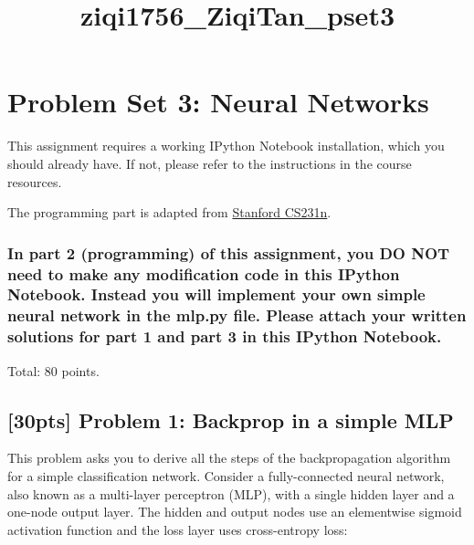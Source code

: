\documentclass[11pt]{article}
\title{ziqi1756\_ZiqiTan\_pset3}
\begin{document}
    
    \maketitle
    
    

    
    \hypertarget{problem-set-3-neural-networks}{%
\section{Problem Set 3: Neural
Networks}\label{problem-set-3-neural-networks}}

This assignment requires a working IPython Notebook installation, which
you should already have. If not, please refer to the instructions in the
course resources.

The programming part is adapted from
\href{http://cs231n.stanford.edu/}{Stanford CS231n}.

\hypertarget{in-part-2-programming-of-this-assignment-you-do-not-need-to-make-any-modification-code-in-this-ipython-notebook.-instead-you-will-implement-your-own-simple-neural-network-in-the-mlp.py-file.-please-attach-your-written-solutions-for-part-1-and-part-3-in-this-ipython-notebook.}{%
\subsubsection{In part 2 (programming) of this assignment, you DO NOT
need to make any modification code in this IPython Notebook. Instead you
will implement your own simple neural network in the mlp.py file. Please
attach your written solutions for part 1 and part 3 in this IPython
Notebook.}\label{in-part-2-programming-of-this-assignment-you-do-not-need-to-make-any-modification-code-in-this-ipython-notebook.-instead-you-will-implement-your-own-simple-neural-network-in-the-mlp.py-file.-please-attach-your-written-solutions-for-part-1-and-part-3-in-this-ipython-notebook.}}

Total: 80 points.

    \hypertarget{pts-problem-1-backprop-in-a-simple-mlp}{%
\subsection{{[}30pts{]} Problem 1: Backprop in a simple
MLP}\label{pts-problem-1-backprop-in-a-simple-mlp}}

This problem asks you to derive all the steps of the backpropagation
algorithm for a simple classification network. Consider a
fully-connected neural network, also known as a multi-layer perceptron
(MLP), with a single hidden layer and a one-node output layer. The
hidden and output nodes use an elementwise sigmoid activation function
and the loss layer uses cross-entropy loss:
\end{document}
